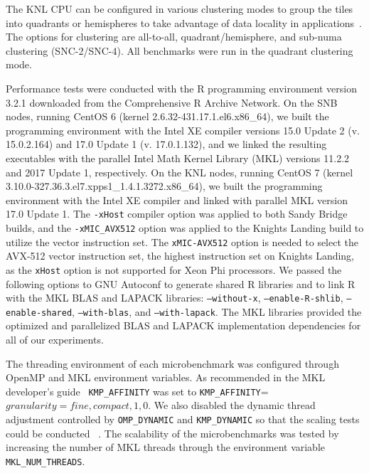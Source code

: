 The KNL CPU can be configured in various clustering modes to group the tiles into
quadrants or hemispheres to take advantage of data locality in
applications~\cite{vladimirov:knlModes}. The options for clustering are all-to-all,
quadrant/hemisphere, and sub-numa clustering (SNC-2/SNC-4). All benchmarks were run in the
quadrant clustering mode.

Performance tests were conducted with the R programming environment version 3.2.1
downloaded from the Comprehensive R Archive Network. On the SNB nodes, running CentOS 6
(kernel 2.6.32-431.17.1.el6.x86\_64), we built the programming environment with the Intel
XE compiler versions 15.0 Update 2 (v. 15.0.2.164) and 17.0 Update 1 (v. 17.0.1.132), and
we linked the resulting executables with the parallel Intel Math Kernel Library (MKL)
versions 11.2.2 and 2017 Update 1, respectively. On the KNL nodes, running CentOS 7
(kernel 3.10.0-327.36.3.el7.xpps1\_1.4.1.3272.x86\_64), we built the programming
environment with the Intel XE compiler and linked with parallel MKL version 17.0 Update 1.
The \texttt{-xHost} compiler option was applied to both Sandy Bridge builds, and the
\texttt{-xMIC\_AVX512} option was applied to the Knights Landing build to utilize the
vector instruction set. The \texttt{xMIC-AVX512} option is needed to select the AVX-512
vector instruction set, the highest instruction set on Knights Landing, as the
\texttt{xHost} option is not supported for Xeon Phi processors. We passed the following
options to GNU Autoconf to generate shared R libraries and to link R with the MKL BLAS and
LAPACK libraries: \texttt{--without-x}, \texttt{--enable-R-shlib},
\texttt{--enable-shared}, \texttt{--with-blas}, and \texttt{--with-lapack}. The MKL
libraries provided the optimized and parallelized BLAS and LAPACK implementation
dependencies for all of our experiments.

The threading environment of each microbenchmark was configured through OpenMP and MKL
environment variables. As recommended in the MKL developer's guide~\cite{intel:mkl2017}
\texttt{KMP\_AFFINITY} was set to \texttt{KMP\_AFFINITY}=$granularity=fine,compact,1,0$.
We also disabled the dynamic thread adjustment controlled by \texttt{OMP\_DYNAMIC} and
\texttt{KMP\_DYNAMIC} so that the scaling tests could be conducted ~\cite{intel:cpp2015,
intel:cpp2017, intel:mkl11_2, intel:mkl2017}. The scalability of the microbenchmarks was
tested by increasing the number of MKL threads through the environment variable
\texttt{MKL\_NUM\_THREADS}.

